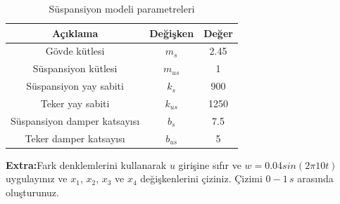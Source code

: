 \begin{table}[!htb]
    \centering
    \begin{tabular}{ccc}\hline
        \textbf{Açıklama}&\textbf{Değişken}& \textbf{Değer}\\\hline
        Gövde kütlesi&$m_s$& 2.45  \\
        Süspansiyon kütlesi&$m_{us}$& 1   \\
        Süspansiyon yay sabiti&$k_s$& 900 \\  
        Teker yay sabiti&$k_{us}$& 1250 \\
        Süspansiyon damper katsayısı&$b_s$& 7.5 \\
        Teker damper katsayısı&$b_{us}$& 5 \\  \hline
    \end{tabular}
    \caption{Süspansiyon modeli parametreleri}
\end{table}

\noindent\textbf{Extra:}Fark denklemlerini kullanarak $u$ girişine sıfır ve $w=0.04sin(2\pi10t)$ uygulayınız ve $x_1$, $x_2$, $x_3$ ve $x_4$ değişkenlerini çiziniz. Çizimi $0-1\,s$ arasında oluşturunuz. 